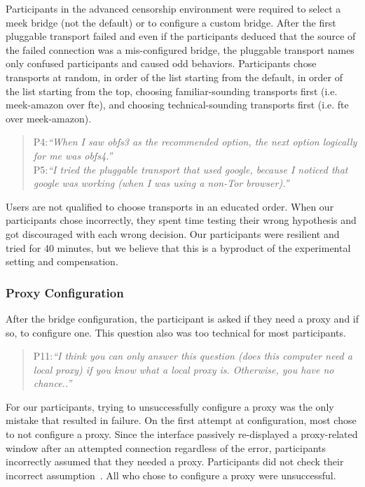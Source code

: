 \documentclass[USenglish,oneside,twocolumn]{article}
\begin{document}
Participants in the advanced censorship environment were required to select a meek bridge (not the default) or to configure a custom bridge. After the first pluggable transport failed and even if the participants deduced that the source of the failed connection was a mis-configured bridge, the pluggable transport names only confused participants and caused odd behaviors. Participants chose transports at random, in order of the list starting from the default, in order of the list starting from the top, choosing familiar-sounding transports first (i.e. meek-amazon over fte), and choosing technical-sounding transports first (i.e. fte over meek-amazon). 

\begin{quotation}
\noindent P4:\textit{``When I saw obfs3 as the recommended option, the next option logically for me was obfs4.''}\\

\noindent P5:\textit{``I tried the pluggable transport that used google, because I noticed that google was working (when I was using a non-Tor browser).''}
\end{quotation} 

Users are not qualified to choose transports in an educated order. When our participants chose incorrectly, they spent time testing their wrong hypothesis and got discouraged with each wrong decision. Our participants were resilient and tried for 40 minutes, but we believe that this is a byproduct of the experimental setting and compensation.

\subsubsection{Proxy Configuration} 
After the bridge configuration, the participant is asked if they need a proxy and if so, to configure one. This question also was too technical for most participants.

\begin{quotation}
\noindent P11:\textit{``I think you can only answer this question (does this computer need a local proxy) if you know what a local proxy is. Otherwise, you have no chance..''}
\end{quotation}

For our participants, trying to unsuccessfully configure a proxy was the only mistake that resulted in failure. On the first attempt at configuration, most chose to not configure a proxy. Since the interface passively re-displayed a proxy-related window after an attempted connection regardless of the error, participants incorrectly assumed that they needed a proxy. Participants did not check their incorrect assumption~\cite{wason1960failure}. All who chose to configure a proxy were unsuccessful. 
\end{document}
